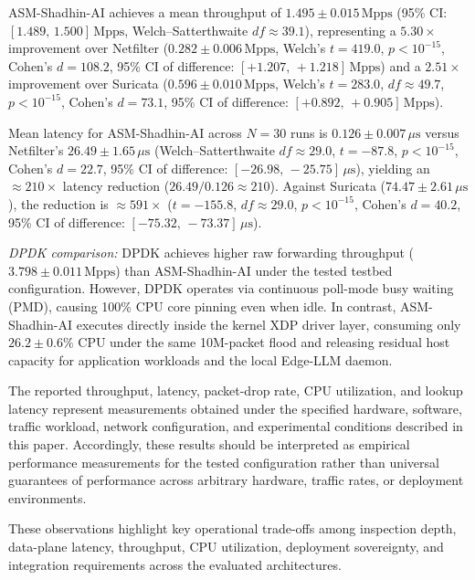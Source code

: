 \documentclass[journal]{IEEEtran}
\renewcommand{\_}{\textunderscore\allowbreak}
\begin{document}
ASM-Shadhin-AI achieves a mean throughput of $1.495 \pm 0.015\,\text{Mpps}$
(95\% CI: $[1.489,\, 1.500]\,\text{Mpps}$, Welch--Satterthwaite
$\mathit{df} \approx 39.1$), representing a $5.30\times$
improvement over Netfilter ($0.282 \pm 0.006\,\text{Mpps}$, Welch's $t = 419.0$,
$p < 10^{-15}$, Cohen's $d = 108.2$, 95\% CI of difference: $[+1.207,\, +1.218]\,\text{Mpps}$) and a $2.51\times$
improvement over Suricata ($0.596 \pm 0.010\,\text{Mpps}$, Welch's $t = 283.0$,
$\mathit{df} \approx 49.7$, $p < 10^{-15}$, Cohen's $d = 73.1$, 95\% CI of difference: $[+0.892,\, +0.905]\,\text{Mpps}$).

Mean latency for ASM-Shadhin-AI across $N=30$ runs is
$0.126 \pm 0.007\,\mu\text{s}$ versus Netfilter's $26.49 \pm 1.65\,\mu\text{s}$
(Welch--Satterthwaite $\mathit{df} \approx 29.0$, $t = -87.8$, $p < 10^{-15}$, Cohen's $d = 22.7$,
95\% CI of difference: $[-26.98,\, -25.75]\,\mu\text{s}$), yielding an
$\approx\!210\times$ latency reduction ($26.49 / 0.126 \approx 210$).
Against Suricata ($74.47 \pm 2.61\,\mu\text{s}$), the reduction is $\approx\!591\times$
($t = -155.8$, $\mathit{df} \approx 29.0$, $p < 10^{-15}$, Cohen's $d = 40.2$,
95\% CI of difference: $[-75.32,\, -73.37]\,\mu\text{s}$).

\textit{DPDK comparison:} DPDK achieves higher raw forwarding throughput
($3.798 \pm 0.011\,\text{Mpps}$) than ASM-Shadhin-AI under the tested testbed
configuration. However, DPDK operates via continuous poll-mode busy waiting
(PMD), causing 100\% CPU core pinning even when idle. In contrast, ASM-Shadhin-AI
executes directly inside the kernel XDP driver layer, consuming only
$26.2 \pm 0.6\%$ CPU under the same 10M-packet flood and releasing residual
host capacity for application workloads and the local Edge-LLM daemon.

The reported throughput, latency, packet-drop rate, CPU utilization, and lookup
latency represent measurements obtained under the specified hardware, software,
traffic workload, network configuration, and experimental conditions described in
this paper. Accordingly, these results should be interpreted as empirical
performance measurements for the tested configuration rather than universal
guarantees of performance across arbitrary hardware, traffic rates, or deployment
environments.

These observations highlight key operational trade-offs among inspection depth,
data-plane latency, throughput, CPU utilization, deployment sovereignty, and
integration requirements across the evaluated architectures.
\end{document}
